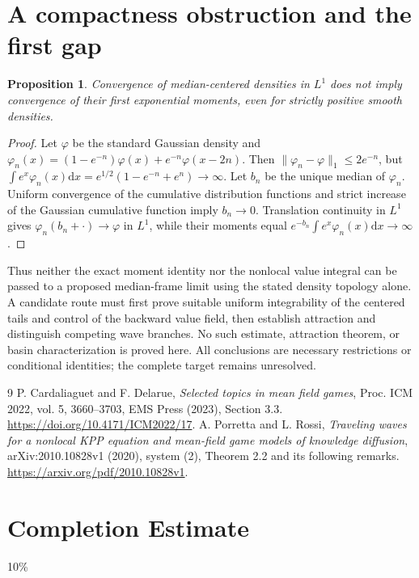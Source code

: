 \documentclass[11pt]{article}
\newtheorem{proposition}[theorem]{Proposition}
\newcommand{\dd}{\mathrm d}
\begin{document}
\section{A compactness obstruction and the first gap}
\begin{proposition}
Convergence of median-centered densities in $L^1$ does not imply convergence of their first exponential moments, even for strictly positive smooth densities.
\end{proposition}
\begin{proof}
Let $\varphi$ be the standard Gaussian density and $\varphi_n(x)=(1-e^{-n})\varphi(x)+e^{-n}\varphi(x-2n)$. Then $\|\varphi_n-\varphi\|_1\le2e^{-n}$, but
$\int e^x\varphi_n(x)\dd x=e^{1/2}(1-e^{-n}+e^n)\to\infty$.
Let $b_n$ be the unique median of $\varphi_n$. Uniform convergence of the cumulative distribution functions and strict increase of the Gaussian cumulative function imply $b_n\to0$. Translation continuity in $L^1$ gives $\varphi_n(b_n+\cdot)\to\varphi$ in $L^1$, while their moments equal $e^{-b_n}\int e^x\varphi_n(x)\dd x\to\infty$.
\end{proof}
Thus neither the exact moment identity nor the nonlocal value integral can be passed to a proposed median-frame limit using the stated density topology alone. A candidate route must first prove suitable uniform integrability of the centered tails and control of the backward value field, then establish attraction and distinguish competing wave branches. No such estimate, attraction theorem, or basin characterization is proved here. All conclusions are necessary restrictions or conditional identities; the complete target remains unresolved.

\begin{thebibliography}{9}
 P. Cardaliaguet and F. Delarue, \emph{Selected topics in mean field games}, Proc. ICM 2022, vol. 5, 3660--3703, EMS Press (2023), Section 3.3. \url{https://doi.org/10.4171/ICM2022/17}.
 A. Porretta and L. Rossi, \emph{Traveling waves for a nonlocal KPP equation and mean-field game models of knowledge diffusion}, arXiv:2010.10828v1 (2020), system (2), Theorem 2.2 and its following remarks. \url{https://arxiv.org/pdf/2010.10828v1}.
\end{thebibliography}

\section{Completion Estimate}
10\%
\end{document}
